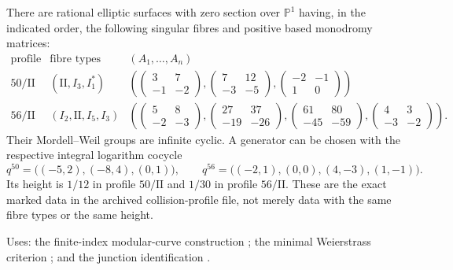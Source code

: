 \begin{theorem}
\label{mapsD:repair:collision-realization}
There are rational elliptic surfaces with zero section over
$\mathbb P^1$ having, in the indicated order, the following singular
fibres and positive based monodromy matrices:
\[
\begin{array}{c|c|c}
\text{profile}&\text{fibre types}&(A_1,\ldots,A_n)\\ \hline
50/\mathrm{II}&(\mathrm{II},I_3,I_1^*)&
\left(
\begin{pmatrix}3&7\\-1&-2\end{pmatrix},
\begin{pmatrix}7&12\\-3&-5\end{pmatrix},
\begin{pmatrix}-2&-1\\1&0\end{pmatrix}\right)\\[5pt]
56/\mathrm{II}&(I_2,\mathrm{II},I_5,I_3)&
\left(
\begin{pmatrix}5&8\\-2&-3\end{pmatrix},
\begin{pmatrix}27&37\\-19&-26\end{pmatrix},
\begin{pmatrix}61&80\\-45&-59\end{pmatrix},
\begin{pmatrix}4&3\\-3&-2\end{pmatrix}\right).
\end{array}
\]
Their Mordell--Weil groups are infinite cyclic.  A generator can be
chosen with the respective integral logarithm cocycle
\[
 q^{50}=\bigl((-5,2),(-8,4),(0,1)\bigr),\qquad
 q^{56}=\bigl((-2,1),(0,0),(4,-3),(1,-1)\bigr).
\]
Its height is $1/12$ in profile $50/\mathrm{II}$ and $1/30$ in
profile $56/\mathrm{II}$.  These are the exact marked data in the
archived collision-profile file, not merely data with the same fibre
types or the same height.
\end{theorem}
\noindent\textsf{Uses:} the finite-index modular-curve construction
\cite[Propositions~2.16, 2.21; Theorem~2.22; Proposition~4.3 and
Remark~4.4]{mapsMilne2017}; the minimal Weierstrass criterion
\cite[\S4.5, Table~1; \S8.2--8.4]{manSS10}; and the junction
identification \cite[\S3.1, (4), (8), (9); Lemmas~3.1--3.2, 4.1;
Corollaries~4.2--4.3]{manFukae02}.

